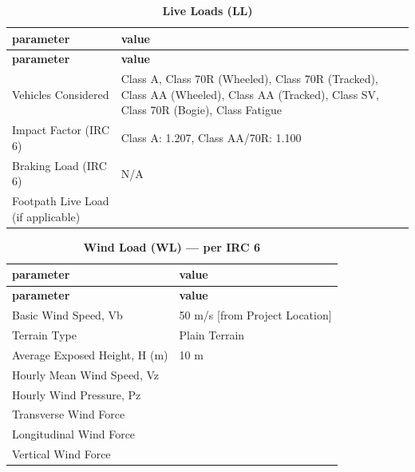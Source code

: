 \documentclass[12pt,a4paper]{report}
\numberwithin{table}{chapter}
\numberwithin{figure}{chapter}
\begin{document}
\vspace{1em}
\begin{longtable}{|L{5.5cm}|p{10.0cm}|}
\caption{\textbf{Live Loads (LL)}}
\hline
\textbf{parameter} & \textbf{value} \\
\hline

\endfirsthead
\hline
\textbf{parameter} & \textbf{value} \\
\hline
\endhead

\textnormal{Vehicles Considered} & Class A, Class 70R (Wheeled), Class 70R (Tracked), Class AA (Wheeled), Class AA (Tracked), Class SV, Class 70R (Bogie), Class Fatigue \\[6pt]
\hline
\textnormal{Impact Factor (IRC 6)} & Class A:\allowbreak{} 1.207, Class AA/70R:\allowbreak{} 1.100 \\[6pt]
\hline
\textnormal{Braking Load (IRC 6)} & N/A \\[6pt]
\hline
\textnormal{Footpath Live Load (if applicable)} &  \\[6pt]
\hline
\end{longtable}

\vspace{1em}
\begin{longtable}{|L{5.5cm}|p{10.0cm}|}
\caption{\textbf{Wind Load (WL) --- per IRC 6}}
\hline
\textbf{parameter} & \textbf{value} \\
\hline

\endfirsthead
\hline
\textbf{parameter} & \textbf{value} \\
\hline
\endhead

\textnormal{Basic Wind Speed, Vb} & 50 m/s [from Project Location] \\[6pt]
\hline
\textnormal{Terrain Type} & Plain Terrain \\[6pt]
\hline
\textnormal{Average Exposed Height, H (m)} & 10 m \\[6pt]
\hline
\textnormal{Hourly Mean Wind Speed, Vz} &  \\[6pt]
\hline
\textnormal{Hourly Wind Pressure, Pz} &  \\[6pt]
\hline
\textnormal{Transverse Wind Force} &  \\[6pt]
\hline
\textnormal{Longitudinal Wind Force} &  \\[6pt]
\hline
\textnormal{Vertical Wind Force} &  \\[6pt]
\hline
\end{longtable}
\end{document}
